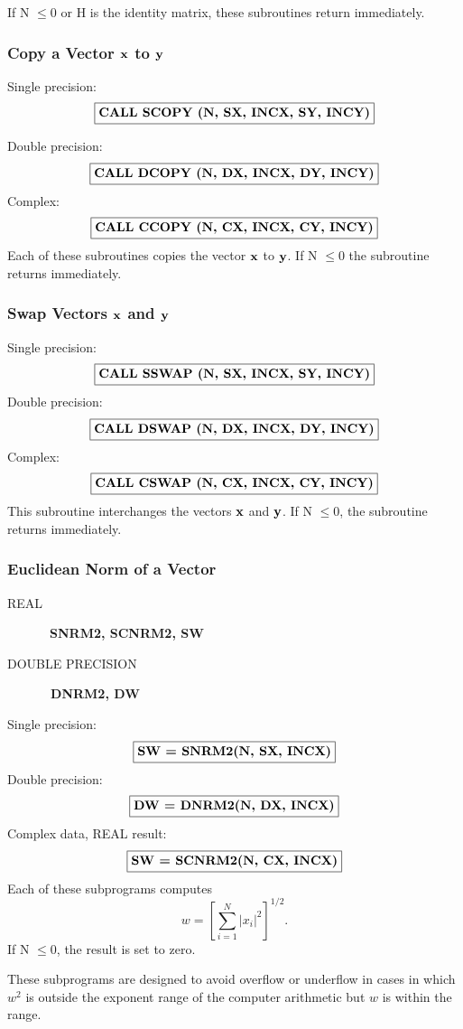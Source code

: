 \documentclass[twoside]{MATH77}
\begin{document}
If N $\leq 0$ or H is the identity matrix, these subroutines return
immediately.

\subsubsection{Copy a Vector ${\bf x}$ to ${\bf y}$\label{B8}}

Single precision:
$$
\fbox{{\bf CALL SCOPY (N, SX, INCX, SY, INCY)}}
$$

Double precision:
$$
\fbox{{\bf CALL DCOPY (N, DX, INCX, DY, INCY)}}
$$
Complex:
$$
\fbox{\bf CALL CCOPY (N, CX, INCX, CY, INCY)}
$$
Each of these subroutines copies the vector ${\bf x}$ to ${\bf y}$. If N $%
\leq 0$ the subroutine returns immediately.

\subsubsection{Swap Vectors ${\bf x}$ and ${\bf y}$\label{B9}}

Single precision:
$$
\fbox{{\bf CALL SSWAP (N, SX, INCX, SY, INCY)}}
$$
Double precision:
$$
\fbox{{\bf CALL DSWAP (N, DX, INCX, DY, INCY)}}
$$
Complex:
$$
\fbox{{\bf CALL CSWAP (N, CX, INCX, CY, INCY)}}
$$
This subroutine interchanges the vectors ${\bf x}$ and ${\bf y}$. If N $\leq
0 $, the subroutine returns immediately.

\subsubsection{Euclidean Norm of a Vector\label{B10}}
\begin{description}
\item[REAL]  \ {\bf SNRM2, SCNRM2, SW }

\item[DOUBLE PRECISION]  {\bf \ DNRM2, DW }
\end{description}
Single precision:
$$
\fbox{{\bf SW = SNRM2(N, SX, INCX)}}
$$
Double precision:
$$
\fbox{{\bf DW = DNRM2(N, DX, INCX)}}
$$
Complex data, REAL result:
$$
\fbox{{\bf SW = SCNRM2(N, CX, INCX)}}
$$
Each of these subprograms computes%
\begin{equation*}
w=\left[ \sum_{i=1}^N|x_i|^2\right] ^{1/2}.
\end{equation*}
If N $\leq 0$, the result is set to zero.

These subprograms are designed to avoid overflow or underflow in cases in
which $w^2$ is outside the exponent range of the computer arithmetic but $w$
is within the range.
\end{document}
